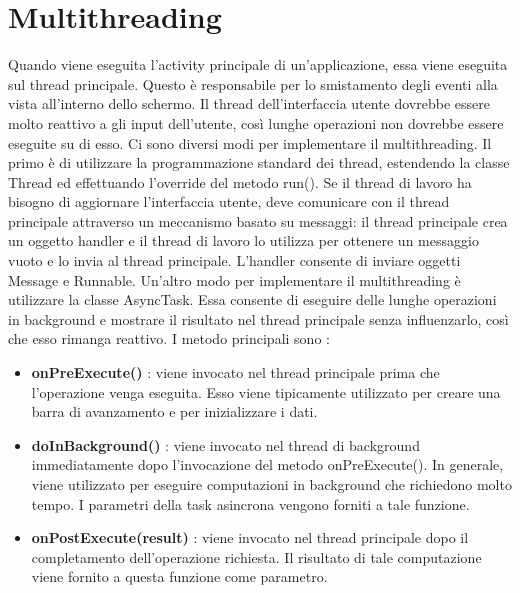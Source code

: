 \section{Multithreading}
Quando viene eseguita l'activity principale di un'applicazione, essa viene eseguita sul thread principale. Questo è responsabile per lo smistamento degli eventi alla vista all'interno dello schermo. Il thread dell'interfaccia utente dovrebbe essere molto reattivo a gli input dell'utente, così lunghe operazioni non dovrebbe essere eseguite su di esso. Ci sono diversi modi per implementare il multithreading. Il primo è di utilizzare la programmazione standard dei thread, estendendo la classe Thread ed effettuando l'override del metodo run(). Se il thread di lavoro ha bisogno di aggiornare l'interfaccia utente, deve comunicare con il thread principale attraverso un meccanismo basato su messaggi: il thread principale crea un oggetto handler e il thread di lavoro lo utilizza per ottenere un messaggio vuoto e lo invia al thread principale. L'handler consente di inviare oggetti Message e Runnable. Un'altro modo per implementare il multithreading è utilizzare la classe AsyncTask. Essa consente di eseguire delle lunghe operazioni in background e mostrare il risultato nel thread principale senza influenzarlo, così che esso rimanga reattivo. I metodo principali sono :
\begin{itemize}
\item \textbf{onPreExecute()} : viene invocato nel thread principale prima che l’operazione venga eseguita. Esso viene tipicamente utilizzato per creare una barra di avanzamento e per inizializzare i dati.
\item \textbf{doInBackground()} : viene invocato nel thread di background immediatamente dopo l’invocazione del metodo onPreExecute(). In generale, viene utilizzato per eseguire computazioni in background che richiedono molto tempo. I parametri della task asincrona vengono forniti a tale funzione.
\item \textbf{onPostExecute(result)} : viene invocato nel thread principale dopo il completamento dell’operazione richiesta. Il risultato di tale computazione viene fornito a questa funzione come parametro.
\end{itemize}